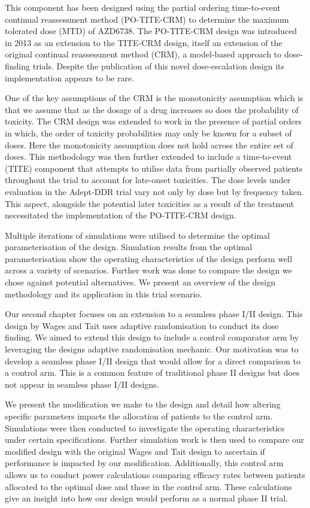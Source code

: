 This component has been designed using the partial ordering time-to-event continual reassessment method (PO-TITE-CRM) to determine the maximum tolerated dose (MTD) of AZD6738. The PO-TITE-CRM design was introduced in 2013 as an extension to the TITE-CRM design, itself an extension of the original continual reassessment method (CRM), a model-based approach to dose-finding trials. Despite the publication of this novel dose-escalation design its implementation appears to be rare. 

One of the key assumptions of the CRM is the monotonicity assumption which is that we assume that as the dosage of a drug increases so does the probability of toxicity. The CRM design was extended to work in the presence of partial orders in which, the order of toxicity probabilities may only be known for a subset of doses. Here the monotonicity assumption does not hold across the entire set of doses. This methodology was then further extended to include a time-to-event (TITE) component that attempts to utilise data from partially observed patients throughout the trial to account for late-onset toxicities. The dose levels under evaluation in the Adept-DDR trial vary not only by dose but by frequency taken. This aspect, alongside the potential later toxicities as a result of the treatment necessitated the implementation of the PO-TITE-CRM design.  

Multiple iterations of simulations were utilised to determine the optimal parameterisation of the design. Simulation results from the optimal parameterisation show the operating characteristics of the design perform well across a variety of scenarios. Further work was done to compare the design we chose against potential alternatives. We present an overview of the design methodology and its application in this trial scenario.

Our second chapter focuses on an extension to a seamless phase I/II design. This design by Wages and Tait uses adaptive randomisation to conduct its dose finding. We aimed to extend this design to include a control comparator arm by leveraging the designs adaptive randomisation mechanic. Our motivation was to develop a seamless phase I/II design that would allow for a direct comparison to a control arm. This is a common feature of traditional phase II designs but does not appear in seamless phase I/II designs. 

We present the modification we make to the design and detail how altering specific parameters impacts the allocation of patients to the control arm. Simulations were then conducted to investigate the operating characteristics under certain specifications. Further simulation work is then used to compare our modified design with the original Wages and Tait design to ascertain if performance is impacted by our modification. Additionally, this control arm allows us to conduct power calculations comparing efficacy rates between patients allocated to the optimal dose and those in the control arm. These calculations give an insight into how our design would perform as a normal phase II trial. 

